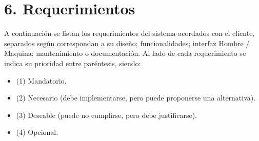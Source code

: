 \documentclass[
11pt, %
codirector, %
]{charter}
\begin{document}
\section{6. Requerimientos}
\label{sec:requerimientos}

A continuación se listan los requerimientos del sistema acordados con el cliente, separados según correspondan a su diseño; funcionalidades; interfaz Hombre / Maquina; mantenimiento o documentación. Al lado de cada requerimiento se indica su prioridad entre paréntesis, siendo:
\begin{itemize}
	\item (1) Mandatorio.
	\item (2) Necesario (debe implementarse, pero puede proponerse una alternativa).
	\item (3) Deseable (puede no cumplirse, pero debe justificarse).
	\item (4) Opcional.
\end{itemize} 
\end{document}
